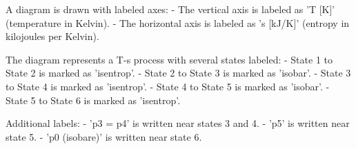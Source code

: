 A diagram is drawn with labeled axes:  
- The vertical axis is labeled as 'T [K]' (temperature in Kelvin).  
- The horizontal axis is labeled as 's [kJ/K]' (entropy in kilojoules per Kelvin).  

The diagram represents a T-s process with several states labeled:  
- State 1 to State 2 is marked as 'isentrop'.  
- State 2 to State 3 is marked as 'isobar'.  
- State 3 to State 4 is marked as 'isentrop'.  
- State 4 to State 5 is marked as 'isobar'.  
- State 5 to State 6 is marked as 'isentrop'.  

Additional labels:  
- 'p3 = p4' is written near states 3 and 4.  
- 'p5' is written near state 5.  
- 'p0 (isobare)' is written near state 6.